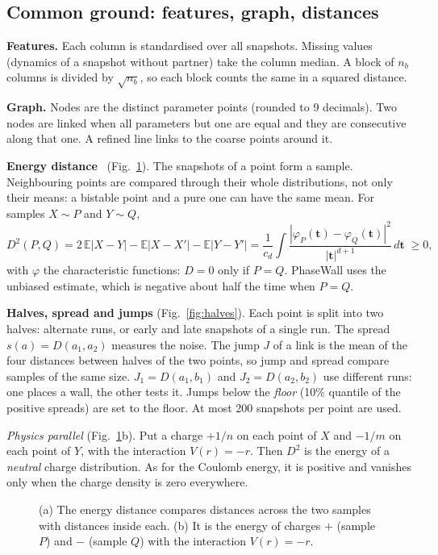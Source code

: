 \documentclass[11pt,a4paper]{article}
\newcommand{\pw}{PhaseWall}
\begin{document}
\subsection{Common ground: features, graph, distances}\label{sec:compare}

\begin{tech}
\textbf{Features.} Each column is standardised over all snapshots. Missing values (dynamics of a snapshot
without partner) take the column median. A block of $n_b$ columns is divided by $\sqrt{n_b}$, so each block
counts the same in a squared distance.

\textbf{Graph.} Nodes are the distinct parameter points (rounded to 9 decimals). Two nodes are linked when all
parameters but one are equal and they are consecutive along that one. A refined line links to the coarse
points around it.

\textbf{Energy distance}~\cite{szekely2013} (Fig.~\ref{fig:energy}). The snapshots of a point form a sample.
Neighbouring points are compared through their whole distributions, not only their means: a bistable point and
a pure one can have the same mean. For samples $X\sim P$ and $Y\sim Q$,
\[
D^2(P,Q)=2\,\mathbb E|X-Y|-\mathbb E|X-X'|-\mathbb E|Y-Y'|
=\frac{1}{c_d}\int\frac{|\varphi_P(\mathbf t)-\varphi_Q(\mathbf t)|^2}{|\mathbf t|^{d+1}}\,d\mathbf t\;\ge0,
\]
with $\varphi$ the characteristic functions: $D=0$ only if $P=Q$. \pw{} uses the unbiased estimate, which is
negative about half the time when $P=Q$.

\textbf{Halves, spread and jumps} (Fig.~\ref{fig:halves}). Each point is split into two halves: alternate runs,
or early and late snapshots of a single run. The spread $s(a)=D(a_1,a_2)$ measures the noise. The jump $J$ of a
link is the mean of the four distances between halves of the two points, so jump and spread compare samples of
the same size. $J_1=D(a_1,b_1)$ and $J_2=D(a_2,b_2)$ use different runs: one places a wall, the other tests it.
Jumps below the \emph{floor} (10\% quantile of the positive spreads) are set to the floor. At most 200 snapshots
per point are used.

\emph{Physics parallel} (Fig.~\ref{fig:energy}b). Put a charge $+1/n$ on each point of $X$ and $-1/m$ on each
point of $Y$, with the interaction $V(r)=-r$. Then $D^2$ is the energy of a \emph{neutral} charge distribution.
As for the Coulomb energy, it is positive and vanishes only when the charge density is zero everywhere.
\end{tech}

\begin{figure}[H]
\centering

\caption{(a) The energy distance compares distances across the two samples with distances inside each. (b) It
is the energy of charges $+$ (sample $P$) and $-$ (sample $Q$) with the interaction $V(r)=-r$.}\label{fig:energy}
\end{figure}
\end{document}
